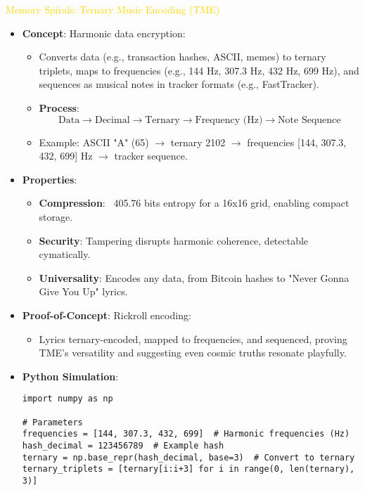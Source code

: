\textcolor{gold}{ Memory Spirals: Ternary Music Encoding (TME) } \\
\begin{itemize}
    \item \texttt{} \textbf{Concept}: Harmonic data encryption:
    \begin{itemize}
        \item Converts data (e.g., transaction hashes, ASCII, memes) to ternary triplets, maps to frequencies (e.g., 144 Hz, 307.3 Hz, 432 Hz, 699 Hz), and sequences as musical notes in tracker formats (e.g., FastTracker).
        \item \textbf{Process}:
        \[
        \text{Data} \rightarrow \text{Decimal} \rightarrow \text{Ternary} \rightarrow \text{Frequency (Hz)} \rightarrow \text{Note Sequence}
        \]
        \item Example: ASCII "A" (65) \(\rightarrow\) ternary 2102 \(\rightarrow\) frequencies [144, 307.3, 432, 699] Hz \(\rightarrow\) tracker sequence.
    \end{itemize}
    \item \texttt{} \textbf{Properties}:
    \begin{itemize}
        \item \textbf{Compression}: ~405.76 bits entropy for a 16x16 grid, enabling compact storage.
        \item \textbf{Security}: Tampering disrupts harmonic coherence, detectable cymatically.
        \item \textbf{Universality}: Encodes any data, from Bitcoin hashes to "Never Gonna Give You Up" lyrics.
    \end{itemize}
    \item \texttt{} \textbf{Proof-of-Concept}: Rickroll encoding:
    \begin{itemize}
        \item Lyrics ternary-encoded, mapped to frequencies, and sequenced, proving TME’s versatility and suggesting even cosmic truths resonate playfully.
    \end{itemize}
    \item \texttt{} \textbf{Python Simulation}:
    \begin{lstlisting}
import numpy as np

# Parameters
frequencies = [144, 307.3, 432, 699]  # Harmonic frequencies (Hz)
hash_decimal = 123456789  # Example hash
ternary = np.base_repr(hash_decimal, base=3)  # Convert to ternary
ternary_triplets = [ternary[i:i+3] for i in range(0, len(ternary), 3)]


\end{lstlisting}
\end{itemize}
